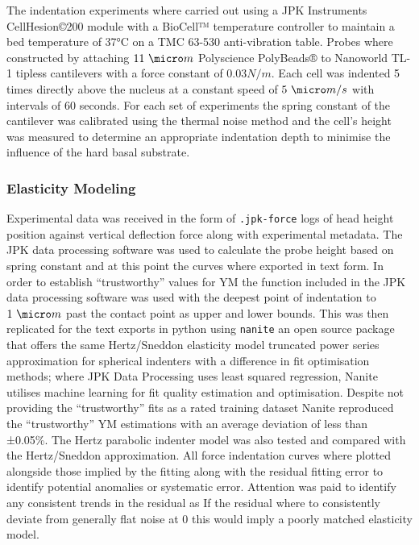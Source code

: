 \documentclass[
  paper=a4,
  ,captions=tableheading
]{scrartcl}
\begin{document}
The indentation experiments where carried out using a JPK Instruments
CellHesion©200 module with a BioCell™ temperature controller to maintain
a bed temperature of 37°C on a TMC 63-530 anti-vibration
table. Probes where constructed by attaching \(11\ \micro m\)
Polyscience PolyBeads® to Nanoworld TL-1 tipless cantilevers with a
force constant of \(0.03 N/m\). Each cell was indented 5 times directly
above the nucleus at a constant speed of \(5\ \micro m / s\) with
intervals of 60 seconds. For each set of experiments the spring constant
of the cantilever was calibrated using the thermal noise method and the
cell's height was measured to determine an appropriate indentation depth
to minimise the influence of the hard basal substrate.

\subsubsection{Elasticity Modeling}\label{elasticity-modeling}

Experimental data was received in the form of \texttt{.jpk-force} logs
of head height position against vertical deflection force along with
experimental metadata. The JPK data processing software was used to
calculate the probe height based on spring constant and at this point
the curves where exported in text form. In order to establish
``trustworthy'' values for YM the function included in the JPK data
processing software was used with the deepest point of indentation to
\(1 \ \micro m\) past the contact point as upper and lower bounds. This
was then replicated for the text exports in python using \texttt{nanite}
an open source package that offers the same Hertz/Sneddon elasticity
model truncated power series approximation for spherical indenters with
a difference in fit optimisation methods; where JPK Data Processing uses
least squared regression, Nanite utilises machine learning for fit
quality estimation and optimisation. Despite not providing the
``trustworthy'' fits as a rated training dataset Nanite reproduced the
``trustworthy'' YM estimations with an average deviation of less than
±0.05\%. The Hertz parabolic indenter model was also tested and compared
with the Hertz/Sneddon approximation. All force indentation curves where
plotted alongside those implied by the fitting along with the residual
fitting error to identify potential anomalies or systematic error.
Attention was paid to identify any consistent trends in the residual as
If the residual where to consistently deviate from generally flat noise
at 0 this would imply a poorly matched elasticity model.
\end{document}
